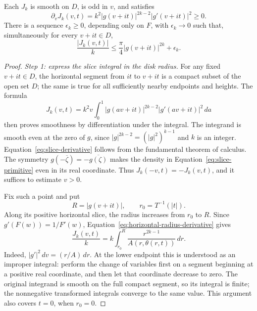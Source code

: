 \begin{proposition}\label{prop:uniform-slice}
Each \(J_k\) is smooth on \(D\), is odd in \(v\), and satisfies
\begin{equation}\label{eq:slice-derivative}
 \partial_v J_k(v,t)
    =k^2|g(v+it)|^{2k-2}|g'(v+it)|^2\ge0.
\end{equation}
There is a sequence \(\epsilon_k\ge0\), depending only on \(F\), with
\(\epsilon_k\to0\) such that, simultaneously for every \(v+it\in D\),
\begin{equation}\label{eq:uniform-slice}
 \frac{|J_k(v,t)|}{k}
    \le\frac{\pi}{4}|g(v+it)|^{2k}+\epsilon_k.
\end{equation}
\end{proposition}

\begin{proof}
\noindent\textit{Step 1: express the slice integral in the disk radius.}
For any fixed \(v+it\in D\), the horizontal segment from \(it\) to
\(v+it\) is a compact subset of the open set \(D\); the same is true
for all sufficiently nearby endpoints and heights.  The formula
\[
 J_k(v,t)=k^2v\int_0^1
       |g(av+it)|^{2k-2}|g'(av+it)|^2\,da
\]
then proves smoothness by differentiation under the integral.
The integrand is smooth even at the zero of \(g\), since
\(|g|^{2k-2}=(|g|^2)^{k-1}\) and \(k\) is an integer.
Equation~\eqref{eq:slice-derivative} follows from the fundamental theorem
of calculus.  The symmetry
\(g(-\overline\zeta)=-\overline{g(\zeta)}\) makes the density in
Equation~\eqref{eq:slice-primitive} even in its real coordinate.  Thus
\(J_k(-v,t)=-J_k(v,t)\), and it suffices to estimate \(v>0\).

Fix such a point and put
\[
 R=|g(v+it)|,\qquad r_0=T^{-1}(|t|).
\]
Along its positive horizontal slice, the radius increases from \(r_0\)
to \(R\).  Since \(g'(F(w))=1/F'(w)\),
Equation~\eqref{eq:horizontal-radius-derivative} gives
\begin{equation}\label{eq:slice-radial-integral}
 \frac{J_k(v,t)}{k}
    =k\int_{r_0}^{R}
       \frac{r^{2k-1}}{A(r,\theta(r,t))}\,dr.
\end{equation}
Indeed, \(|g'|^2\,dv=(r/A)\,dr\).
At the lower endpoint this is understood as an improper integral:
perform the change of variables first on a segment beginning at a
positive real coordinate, and then let that coordinate decrease to zero.
The original integrand is smooth on the full compact segment, so its
integral is finite; the nonnegative transformed integrals converge to
the same value.  This argument also covers \(t=0\), when \(r_0=0\).


\end{proof}
